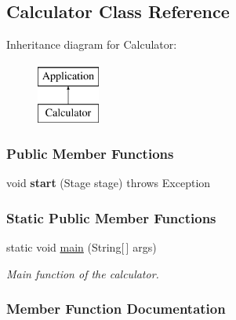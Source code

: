 \hypertarget{classCalculator}{}\subsection{Calculator Class Reference}
\label{classCalculator}
Inheritance diagram for Calculator\+:\begin{figure}[H]
\begin{center}
\leavevmode
\includegraphics[height=2.000000cm]{classCalculator}
\end{center}
\end{figure}
\subsubsection*{Public Member Functions}
\begin{DoxyCompactItemize}
\item 
\mbox{\label{classCalculator_a4aa738e7d39fe99e500fbb0778ca5046}} 
void {\bfseries start} (Stage stage)  throws Exception 
\end{DoxyCompactItemize}
\subsubsection*{Static Public Member Functions}
\begin{DoxyCompactItemize}
\item 
static void \hyperlink{classCalculator_a1efab50ed4696158d68289e20c255e7f}{main} (String\mbox{[}$\,$\mbox{]} args)
\begin{DoxyCompactList}\small\item\em Main function of the calculator. \end{DoxyCompactList}\end{DoxyCompactItemize}


\subsubsection{Member Function Documentation}
\mbox{\label{classCalculator_a1efab50ed4696158d68289e20c255e7f}} 
